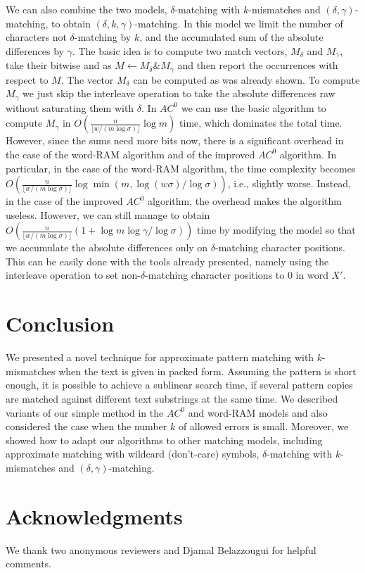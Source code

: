 \documentclass{llncs}
\newcommand{\floor}[1]{\lfloor #1 \rfloor}
\def \band{\textsf{and}\xspace}
\newcommand{\uand}{\mathrel{\&}}
\newcommand{\word}[1]{#1}
\begin{document}
We can also combine the two models, $\delta$-matching with
$k$-mismatches and $(\delta,\gamma)$-matching, to obtain
$(\delta,k,\gamma)$-matching. In this model we limit the number of
characters not $\delta$-matching by $k$, and the accumulated sum of
the absolute differences by $\gamma$. The basic idea is to compute two
match vectors, $M_\delta$ and $M_\gamma$, take their bitwise \band as
$M \leftarrow M_\delta \uand M_\gamma$ and then report the occurrences
with respect to $M$. The vector $M_\delta$ can be computed as was
already shown. To compute $M_\gamma$ we just skip the
\textsf{interleave} operation to take the absolute differences
raw without saturating them with $\delta$. In $AC^0$ we can use the
basic algorithm to compute $M_\gamma$ in
$O(\frac{n}{\floor{w/(m\log\sigma)}} \log m)$ time, which dominates
the total time. However, since the sums need more bits now, there is a
significant overhead in the case of the word-RAM algorithm and of the
improved $AC^0$ algorithm. In particular, in the case of the word-RAM
algorithm, the time complexity becomes
$O(\frac{n}{\floor{w/(m\log\sigma)}} \log \min(m,
\log(w\sigma)/\log\sigma))$, i.e., slightly worse. Instead, in the
case of the improved $AC^0$ algorithm, the overhead makes the
algorithm useless. However, we can still manage to obtain
$O(\frac{n}{\floor{w/(m\log\sigma)}} (1+\log m \log\gamma /
\log\sigma))$ time by modifying the model so that we accumulate the
absolute differences only on $\delta$-matching character positions.
This can be easily done with the tools already presented, namely using
the \textsf{interleave} operation to set non-$\delta$-matching
character positions to 0 in word $\word{X'}$.










\section{Conclusion}
\noindent
We presented a novel technique for approximate pattern matching with
$k$-mismatches when the text is given in packed form. Assuming the
pattern is short enough, it is possible to achieve a sublinear search
time, if several pattern copies are matched against different text
substrings at the same time. We described variants of our simple
method in the $AC^0$ and word-RAM models and also considered the case
when the number $k$ of allowed errors is small. Moreover, we showed
how to adapt our algorithms to other matching models, including
approximate matching with wildcard (don't-care) symbols,
$\delta$-matching with $k$-mismatches and $(\delta, \gamma)$-matching.

\section{Acknowledgments}

We thank two anonymous reviewers and Djamal Belazzougui for helpful comments.



\end{document}
